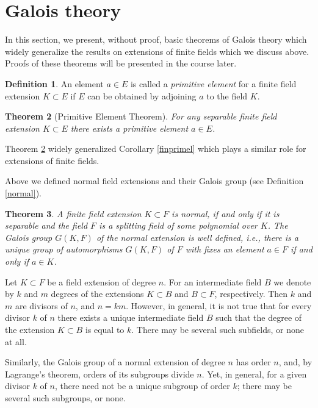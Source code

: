 \documentclass[11pt]{article}
\theoremstyle{plain}
\newtheorem{theorem}{Theorem}[section]
\theoremstyle{definition}
\newtheorem{definition}[theorem]{Definition}
\begin{document}
\section{Galois theory}\label{seceight}
In this section, we present, without proof, basic theorems of Galois theory which widely generalize the  results on extensions of finite fields which we discuss above. Proofs of these theorems will be presented in the course later.

\begin{definition} An element $a\in E$ is called a {\it primitive element} for a finite field extension $K\subset E$   if $E$ can be obtained by adjoining $a$ to the field $K$.
\end{definition}

\begin{theorem}[Primitive Element Theorem]\label{primel} For any separable finite field extension $K\subset E$ there exists  a primitive element $a\in E$.
\end{theorem}

Theorem \ref{primel}  widely  generalized
Corollary \ref{finprimel} which plays a similar role for extensions of finite fields.

Above we defined normal field  extensions and their  Galois group (see  Definition \ref{normal}).

\begin{theorem} A finite field extension $K\subset F$ is normal, if and only if it is separable and the field $F$ is a splitting field of some polynomial over $K$. The Galois group $G(K,F)$ of the normal extension is well defined, i.e., there   is a unique group of automorphisms $G(K,F)$ of $F$ with fixes an  element $a\in F$ if and only if  $a\in K$.
\end{theorem}

Let $K \subset F$ be a field extension of degree $n$. For an intermediate field $B$ we denote  by $k$ and $m$ degrees of the extensions $K \subset B$ and $B \subset F$, respectively. Then $k$ and $m$  are divisors of $n$, and  $n = km$.
However, in general, it is not true that for every divisor $k$ of $n$ there exists a unique intermediate field $B$ such that the degree of the extension $K\subset B$ is equal to $k$. There may be several such subfields, or none at all.

Similarly, the Galois group of a normal extension of degree $n$ has order $n$, and, by Lagrange's theorem,  orders of its  subgroups divide $n$. Yet, in general, for a given divisor $k$ of $n$, there need not be a unique subgroup of order $k$; there may be several such subgroups, or none.
\end{document}
